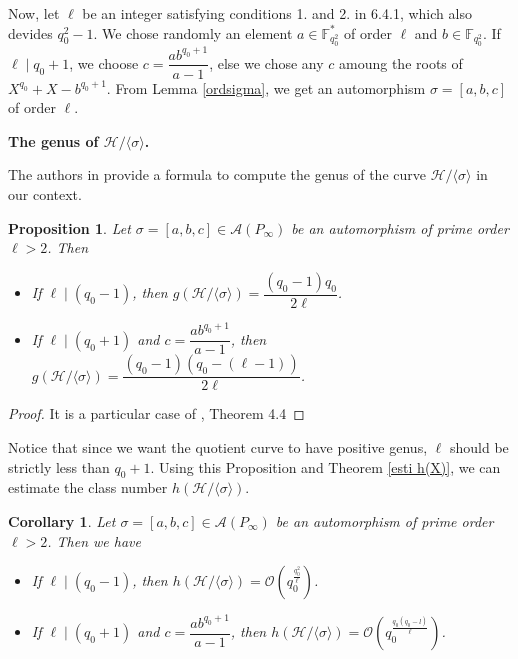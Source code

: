 \documentclass[10pt]{article}
\newtheorem{prop1}{Proposition}[]
\newtheorem{coro1}{Corollary}[]
\newcommand{\s}{\vspace{0.3cm}}
\newcommand{\calA}{\mathcal{A}}
\newcommand{\calH}{\mathcal{H}}
\newcommand{\calO}{\mathcal{O}}
\begin{document}
Now, let $\ell$ be an integer satisfying conditions 1. and 2. in 6.4.1, which also devides $q_0^2-1$. We chose randomly an element $a \in \mathbb{F}_{q_0^2}^*$ of order $\ell$ and $b \in \mathbb{F}_{q_0^2}$. If $\ell \mid q_0+1$, we choose $c=\dfrac{ab^{q_0+1}}{a-1}$, else we chose any $c$ amoung the roots of $X^{q_0}+X-b^{q_0+1}$. From Lemma \ref{ordsigma}, we get an automorphism $\sigma = [a,b,c]$ of order $\ell$.

\s

\bf{The genus of $\calH/\langle \sigma \rangle$}. \rm 

\s

The authors in \cite{Gar} provide a formula to compute the genus of the curve $\calH/\langle \sigma \rangle$ in our context.

\s

\begin{prop1} \label{genus}
Let $\sigma = [a,b,c] \in \calA(P_{\infty})$ be an automorphism of prime order $\ell > 2$. Then 
\begin{itemize}
\item[(i)] If $\ell \mid (q_0-1)$, then $g(\calH/\langle \sigma \rangle) = \dfrac{(q_0-1)q_0}{2\ell}$.
\item[(ii)] If $\ell \mid (q_0+1)$ and $c = \dfrac{ab^{q_0+1}}{a-1}$, then $g(\calH/\langle \sigma \rangle) = \dfrac{(q_0-1)(q_0-(\ell-1))}{2\ell}$.
\end{itemize}
\end{prop1}

\s

\begin{proof}
It is a particular case of \cite{Gar}, Theorem 4.4
\end{proof}

Notice that since we want the quotient curve to have positive genus, $\ell$ should be strictly less than $q_0+1$. Using this Proposition and Theorem \ref{esti h(X)}, we can estimate the class number $h(\calH/\langle \sigma \rangle)$.

\s

\begin{coro1} \label{lastcorollary}
Let $\sigma = [a,b,c] \in \calA(P_{\infty})$ be an automorphism of prime order $\ell > 2$. Then we have 
\begin{itemize}
\item[(i)] If $\ell \mid (q_0-1)$, then $h(\calH/\langle \sigma \rangle) = \calO \left(q_0^{\frac{q_0^2}{\ell}}\right)$.
\item[(ii)] If $\ell \mid (q_0+1)$ and $c=\dfrac{ab^{q_0+1}}{a-1}$, then $h(\calH/\langle \sigma \rangle) = \calO \left(q_0^{\frac{q_0(q_0-l)}{\ell}}\right)$.
\end{itemize}
\end{coro1}
\end{document}
